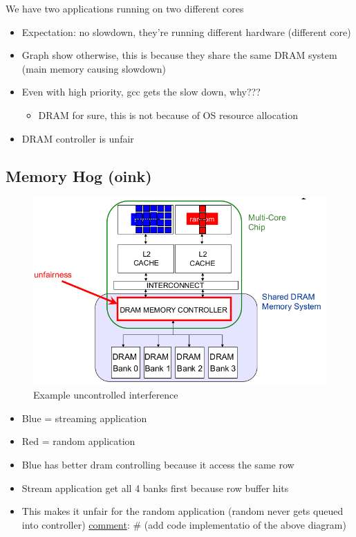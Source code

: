 \documentclass[]{article}
\providecommand{\tightlist}{%
  \setlength{\itemsep}{0pt}\setlength{\parskip}{0pt}}
\begin{document}
We have two applications running on two different cores

\begin{itemize}
\tightlist
\item
  Expectation: no slowdown, they're running different hardware
  (different core)
\item
  Graph show otherwise, this is because they share the same DRAM system
  (main memory causing slowdown)
\item
  Even with high priority, gcc gets the slow down, why???

  \begin{itemize}
  \tightlist
  \item
    DRAM for sure, this is not because of OS resource allocation
  \end{itemize}
\item
  DRAM controller is unfair
\end{itemize}

\newpage

\hypertarget{memory-hog-oink}{%
\subsection{Memory Hog (oink)}\label{memory-hog-oink}}

\begin{figure}
\centering
\includegraphics{./tex2pdf.-ee748c56ff17e1e1/48ee445de0deeb315ed965bd725307bae1a6bee3.png}
\caption{Example uncontrolled interference}
\end{figure}

\begin{itemize}
\tightlist
\item
  Blue = streaming application
\item
  Red = random application
\item
  Blue has better dram controlling because it access the same row
\item
  Stream application get all 4 banks first because row buffer hits
\item
  This makes it unfair for the random application (random never gets
  queued into controller) \protect\hyperlink{}{comment}: \# (add code
  implementatio of the above diagram)
\end{itemize}
\end{document}
